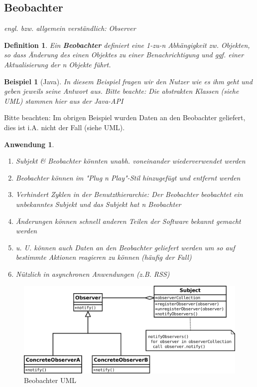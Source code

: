\documentclass[a4paper]{article}
\theoremstyle{break}
\newtheorem{defi}{Definition}[section]
\newtheorem{ex}{Beispiel}[section]
\newtheorem{why}{Anwendung}[section]
\begin{document}
\newpage
\subsection{Beobachter}
\textit{engl. bzw. allgemein verständlich: Observer}
\begin{defi}
	Ein \textbf{Beobachter} definiert eine 1-zu-n Abhängigkeit zw. Objekten, so dass Änderung des einen Objektes zu einer Benachrichtigung und ggf. einer Aktualisierung der n Objekte führt.
\end{defi}
\begin{ex}[Java]
	In diesem Beispiel fragen wir den Nutzer wie es ihm geht und geben jeweils seine Antwort aus. Bitte beachte: Die abstrakten Klassen (siehe UML) stammen hier aus der Java-API
	
	
	
\end{ex}
Bitte beachten: Im obrigen Beispiel wurden Daten an den Beobachter geliefert, dies ist i.A. nicht der Fall (siehe UML).
\begin{why}
	\begin{enumerate}
		\item Subjekt \& Beobachter könnten unabh. voneinander wiederverwendet werden
		\item Beobachter können im "Plug n Play"-Stil hinzugefügt und entfernt werden
		\item Verhindert Zyklen in der Benutzthierarchie: Der Beobachter beobachtet ein unbekanntes Subjekt und das Subjekt hat n Beobachter
		\item Änderungen können schnell anderen Teilen der Software bekannt gemacht werden
		\item u. U. können auch Daten an den Beobachter geliefert werden um so auf bestimmte Aktionen reagieren zu können (häufig der Fall)
		\item Nützlich in asynchronen Anwendungen (z.B. RSS)
	\end{enumerate}
\end{why}
\begin{figure}[H]
	\centering
	\includegraphics[width=\textwidth]{../diagrams/uml/ObserverPattern.png}
	\caption{Beobachter UML}
\end{figure}
\end{document}
